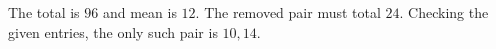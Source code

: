The total is $96$ and mean is $12$. The removed pair must total $24$. Checking the given entries, the only such pair is $\boxed{10,14}$.
